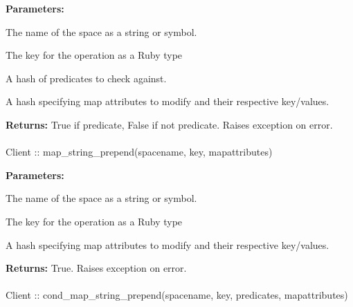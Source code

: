\noindent\textbf{Parameters:}
\begin{description}[labelindent=\widthof{{\code{mapattributes}}},leftmargin=*,noitemsep,nolistsep,align=right]
\item[\code{spacename}] The name of the space as a string or symbol.
\item[\code{key}] The key for the operation as a Ruby type
\item[\code{predicates}] A hash of predicates to check against.
\item[\code{mapattributes}] A hash specifying map attributes to modify and their respective key/values.
\end{description}

\noindent\textbf{Returns:}
True if predicate, False if not predicate.  Raises exception on error.

\paragraph{}
\label{api:ruby:map_string_prepend}
\begin{rubycode}
Client :: map_string_prepend(spacename, key, mapattributes)
\end{rubycode}


\noindent\textbf{Parameters:}
\begin{description}[labelindent=\widthof{{\code{mapattributes}}},leftmargin=*,noitemsep,nolistsep,align=right]
\item[\code{spacename}] The name of the space as a string or symbol.
\item[\code{key}] The key for the operation as a Ruby type
\item[\code{mapattributes}] A hash specifying map attributes to modify and their respective key/values.
\end{description}

\noindent\textbf{Returns:}
True.  Raises exception on error.

\paragraph{}
\label{api:ruby:cond_map_string_prepend}
\begin{rubycode}
Client :: cond_map_string_prepend(spacename, key, predicates, mapattributes)
\end{rubycode}


